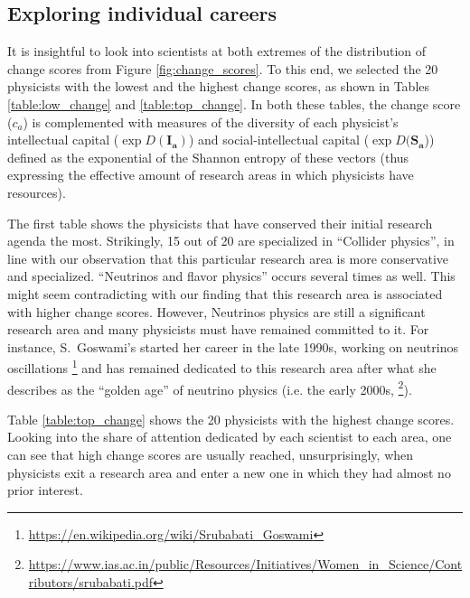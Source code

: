 \documentclass{article}
\begin{document}
\subsection{\label{sec:cases}Exploring individual careers}

It is insightful to look into scientists at both extremes of the distribution of change scores from Figure \ref{fig:change_scores}. To this end, we selected the 20 physicists with the lowest and the highest change scores, as shown in Tables \ref{table:low_change} and \ref{table:top_change}. 
In both these tables, the change score ($c_a$) is complemented with measures of the diversity of each physicist's intellectual capital ($\exp D(\bm{I_a})$) and social-intellectual capital ($\exp D(\bm{S_a}$)) defined as the exponential of the Shannon entropy of these vectors (thus expressing the effective amount of research areas in which physicists have resources).


The first table shows the physicists that have conserved their initial research agenda the most. Strikingly, 15 out of 20 are specialized in ``Collider physics'', in line with our observation that this particular research area is more conservative and specialized. ``Neutrinos and flavor physics'' occurs several times as well. This might seem contradicting with our finding that this research area is associated with higher change scores. However, Neutrinos physics are still a significant research area and many physicists must have remained committed to it. For instance, S.~Goswami's started her career in the late 1990s, working on neutrinos oscillations \footnote{\url{https://en.wikipedia.org/wiki/Srubabati_Goswami}} and has remained dedicated to this research area after what she describes as the ``golden age'' of neutrino physics (i.e. the early 2000s, \footnote{\url{https://www.ias.ac.in/public/Resources/Initiatives/Women_in_Science/Contributors/srubabati.pdf}}).

Table \ref{table:top_change} shows the 20 physicists with the highest change scores.  Looking into the share of attention dedicated by each scientist to each area, one can see that high change scores are usually reached, unsurprisingly, when physicists exit a research area and enter a new one in which they had almost no prior interest. %
\end{document}
